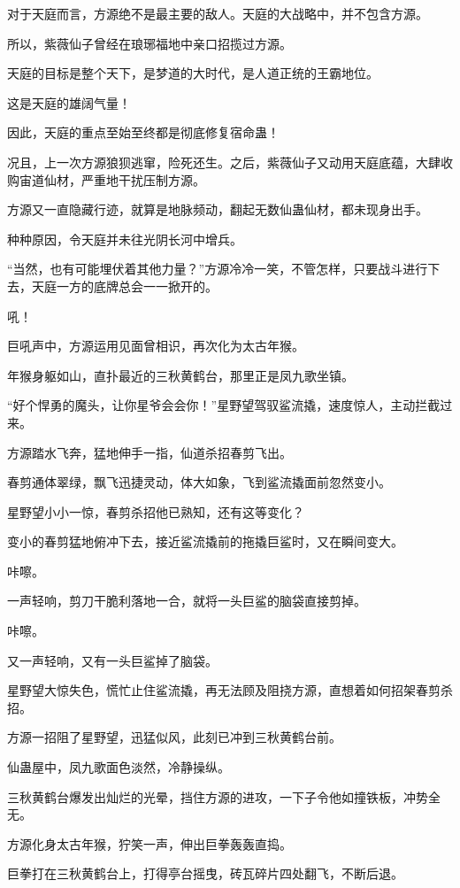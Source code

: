 \begin{this_body}
对于天庭而言，方源绝不是最主要的敌人。天庭的大战略中，并不包含方源。

所以，紫薇仙子曾经在琅琊福地中亲口招揽过方源。

天庭的目标是整个天下，是梦道的大时代，是人道正统的王霸地位。

这是天庭的雄阔气量！

因此，天庭的重点至始至终都是彻底修复宿命蛊！

况且，上一次方源狼狈逃窜，险死还生。之后，紫薇仙子又动用天庭底蕴，大肆收购宙道仙材，严重地干扰压制方源。

方源又一直隐藏行迹，就算是地脉频动，翻起无数仙蛊仙材，都未现身出手。

种种原因，令天庭并未往光阴长河中增兵。

“当然，也有可能埋伏着其他力量？”方源冷冷一笑，不管怎样，只要战斗进行下去，天庭一方的底牌总会一一掀开的。

吼！

巨吼声中，方源运用见面曾相识，再次化为太古年猴。

年猴身躯如山，直扑最近的三秋黄鹤台，那里正是凤九歌坐镇。

“好个悍勇的魔头，让你星爷会会你！”星野望驾驭鲨流撬，速度惊人，主动拦截过来。

方源踏水飞奔，猛地伸手一指，仙道杀招春剪飞出。

春剪通体翠绿，飘飞迅捷灵动，体大如象，飞到鲨流撬面前忽然变小。

星野望小小一惊，春剪杀招他已熟知，还有这等变化？

变小的春剪猛地俯冲下去，接近鲨流撬前的拖撬巨鲨时，又在瞬间变大。

咔嚓。

一声轻响，剪刀干脆利落地一合，就将一头巨鲨的脑袋直接剪掉。

咔嚓。

又一声轻响，又有一头巨鲨掉了脑袋。

星野望大惊失色，慌忙止住鲨流撬，再无法顾及阻挠方源，直想着如何招架春剪杀招。

方源一招阻了星野望，迅猛似风，此刻已冲到三秋黄鹤台前。

仙蛊屋中，凤九歌面色淡然，冷静操纵。

三秋黄鹤台爆发出灿烂的光晕，挡住方源的进攻，一下子令他如撞铁板，冲势全无。

方源化身太古年猴，狞笑一声，伸出巨拳轰轰直捣。

巨拳打在三秋黄鹤台上，打得亭台摇曳，砖瓦碎片四处翻飞，不断后退。


\end{this_body}
